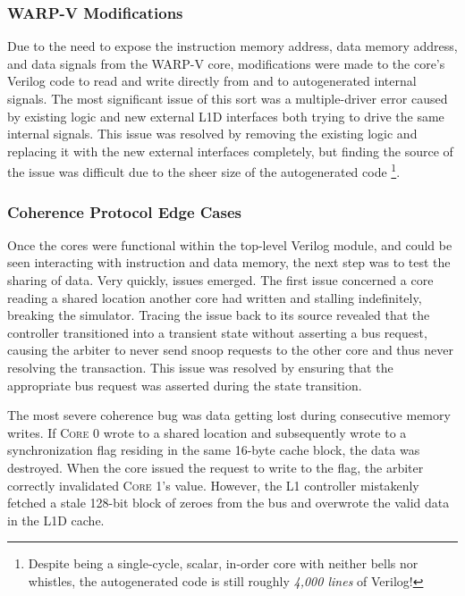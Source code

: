 \documentclass[10pt, compsoc]{IEEEtran}
\begin{document}
\subsubsection*{WARP-V Modifications}

Due to the need to expose the instruction memory address, data memory address, and data signals from the WARP-V core, modifications were made to the core's Verilog code to read and write directly from and to autogenerated internal signals. The most significant issue of this sort was a multiple-driver error caused by existing logic and new external L1D interfaces both trying to drive the same internal signals. This issue was resolved by removing the existing logic and replacing it with the new external interfaces completely, but finding the source of the issue was difficult due to the sheer size of the autogenerated code \footnote{Despite being a single-cycle, scalar, in-order core with neither bells nor whistles, the autogenerated code is still roughly \textit{4,000 lines} of Verilog!}. 



\subsubsection*{Coherence Protocol Edge Cases}

Once the cores were functional within the top-level Verilog module, and could be seen interacting with instruction and data memory, the next step was to test the sharing of data. Very quickly, issues emerged. The first issue concerned a core reading a shared location another core had written and stalling indefinitely, breaking the simulator. Tracing the issue back to its source revealed that the controller transitioned into a transient state without asserting a bus request, causing the arbiter to never send snoop requests to the other core and thus never resolving the transaction. This issue was resolved by ensuring that the appropriate bus request was asserted during the state transition. 



The most severe coherence bug was data getting lost during consecutive memory writes. If \textsc{Core 0} wrote to a shared location and subsequently wrote to a synchronization flag residing in the same 16-byte cache block, the data was destroyed. When the core issued the request to write to the flag, the arbiter correctly invalidated \textsc{Core 1}'s value. However, the L1 controller mistakenly fetched a stale 128-bit block of zeroes from the bus and overwrote the valid data in the L1D cache.
\end{document}
